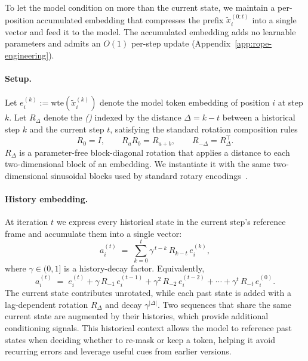 

To let the model condition on more than the current state, we maintain a per-position accumulated embedding that compresses the prefix $\tilde{x}_i^{(0:t)}$ into a single vector and feed it to the model. The accumulated embedding adds no learnable parameters and admits an $O(1)$ per-step update (Appendix~\ref{app:rope-engineering}).

\paragraph{Setup.}
Let $e_i^{(k)} := \mathrm{wte}(\tilde{x}_i^{(k)})$ denote the model token embedding of position $i$ at step $k$. Let $R_\Delta$ denote the \emph{\distancemethodfull (\distancemethod)} indexed by the distance $\Delta = k - t$ between a historical step $k$ and the current step $t$, satisfying the standard rotation composition rules
\[
R_0 = I, \qquad R_a R_b = R_{a+b}, \qquad R_{-\Delta} = R_\Delta^{\top}.
\]
$R_\Delta$ is a parameter-free block-diagonal rotation that applies a distance to each two-dimensional block of an embedding. We instantiate it with the same two-dimensional sinusoidal blocks used by standard rotary encodings~\citep{su2024roformer}.

\paragraph{History embedding.}
At iteration $t$ we express every historical state in the current step's reference frame and accumulate them into a single vector:
\begin{equation}
a_i^{(t)} \;=\; \sum_{k=0}^{t} \gamma^{\,t-k}\, R_{k-t}\, e_i^{(k)},
\label{eq:temporal-embedding}
\end{equation}
where $\gamma \in (0, 1]$ is a history-decay factor. Equivalently,
\[
a_i^{(t)} \;=\; e_i^{(t)} + \gamma\, R_{-1}\, e_i^{(t-1)} + \gamma^{2}\, R_{-2}\, e_i^{(t-2)} + \cdots + \gamma^{t}\, R_{-t}\, e_i^{(0)}.
\]
The current state contributes unrotated, while each past state is added with a lag-dependent rotation \(R_\Delta\) and decay \(\gamma^{|\Delta|}\). Two sequences that share the same current state are augmented by their histories, which provide additional conditioning signals. This historical context allows the model to reference past states when deciding whether to re-mask or keep a token, helping it avoid recurring errors and leverage useful cues from earlier versions.



